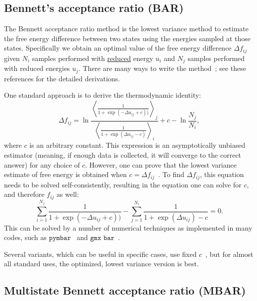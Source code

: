 \documentclass[9pt,review]{livecoms}
\begin{document}
\subsection{Bennett's acceptance ratio (BAR)}

The Bennett acceptance ratio method is the lowest variance method to estimate the free energy difference between two states using the energies sampled at those states. Specifically we
obtain an optimal value of the free energy difference $\Delta f_{ij}$ given $N_i$ samples performed with \hyperlink{ref:reduced} {reduced} energy $u_i$ and $N_j$ samples performed with reduced energies $u_j$. There are many ways to write
the method~\cite{bennett:jcp:1976:fe-estimate,shirts_comparison_2005,fenwick-escobedo:jcp:2003:replica-exchange-expanded-ensembles}; see these references for the detailed derivations.

One standard approach is to derive the thermodynamic identity:
\begin{equation}
\Delta f_{ij} = \ln \frac{\left\langle \frac{1}{1 + \exp(-\Delta u_{ij}+c))}\right\rangle_j}{\left \langle \frac{1}{1 + \exp(\Delta u_{ij}-c)}\right\rangle_i} + c-\ln\frac{N_j}{N_i},
\end{equation}
where $c$ is an arbitrary constant. This expression is an asymptotically unbiased estimator (meaning, if enough data is collected, it will converge to the correct answer) for any choice
of $c$. However, one can prove that the lowest variance estimate of free energy is obtained when $c=\Delta f_{ij}$~\cite{bennett:jcp:1976:fe-estimate}. To find $\Delta f_{ij}$, this equation needs to be solved self-consistently, resulting in the equation one can solve for $c$, and therefore $f_{ij}$ as well:
\begin{equation}
\sum_{i=1}^{N_j} \frac{1}{1 + \exp(-\Delta u_{ij}+c))} - \sum_{j=1}^{N_i} \frac{1}{1 + \exp(\Delta u_{ij})-c} = 0.
\end{equation}
This can be solved by a number of numerical techniques as implemented in many codes, such as $\texttt{pymbar}$~\cite{shirts-chodera:jcp:2008:mbar} and $\texttt{gmx bar}$~\cite{lindahl_2021}.

Several variants, which can be useful in specific cases, use fixed $c$~\cite{fenwick-escobedo:jcp:2003:replica-exchange-expanded-ensembles,Paliwal_comparison_2011}, but for almost all standard uses, the optimized, lowest variance version is best.


\subsection{Multistate Bennett acceptance ratio (MBAR)}
\end{document}
